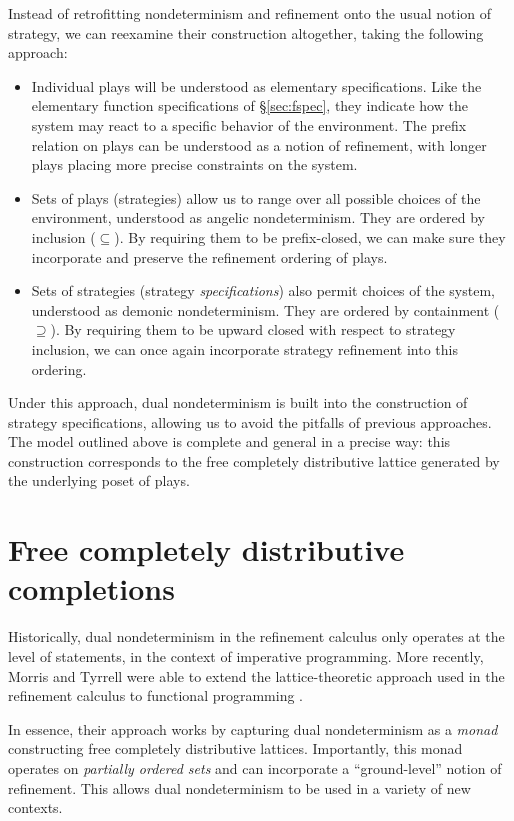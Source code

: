\documentclass[11pt,oneside,draft]{book}
\theoremstyle{definition}
\begin{document}
Instead of retrofitting nondeterminism and refinement
onto the usual notion of strategy,
we can reexamine their construction altogether,
taking the following approach:
\begin{itemize}
  \item Individual plays will be understood as
    elementary specifications.
    Like the elementary function specifications of \S\ref{sec:fspec},
    they indicate how the system may react
    to a specific behavior of the environment.
    The prefix relation on plays
    can be understood as a notion of refinement,
    with longer plays placing more precise constraints
    on the system.
  \item Sets of plays (strategies)
    allow us to range over all possible choices of the environment,
    understood as angelic nondeterminism.
    They are ordered by inclusion ($\subseteq$).
    By requiring them to be prefix-closed,
    we can make sure they incorporate and preserve the refinement
    ordering of plays.
  \item Sets of strategies (strategy \emph{specifications})
    also permit choices of the system,
    understood as demonic nondeterminism.
    They are ordered by containment ($\supseteq$).
    By requiring them to be upward closed with respect to strategy inclusion,
    we can once again incorporate strategy refinement
    into this ordering.
\end{itemize}
Under this approach,
dual nondeterminism is built into
the construction of strategy specifications,
allowing us to avoid the pitfalls of previous approaches.
The model outlined above is complete and general
in a precise way:
this construction
corresponds to the free completely distributive lattice
generated by the underlying poset of plays.



\section{Free completely distributive completions} \label{sec:fcd} %

Historically,
dual nondeterminism in the refinement calculus
only operates at the level of statements,
in the context of imperative programming.
More recently,
Morris and Tyrrell were able to extend
the lattice-theoretic approach used in the refinement calculus
to functional programming
\citep{augtyp,dndf,cspdnd}.

In essence,
their approach works by
capturing dual nondeterminism as a \emph{monad}
constructing free completely distributive lattices.
Importantly,
this monad operates on \emph{partially ordered sets}
and can incorporate
a ``ground-level'' notion of refinement.
This allows dual nondeterminism to be used
in a variety of new contexts.
\end{document}
